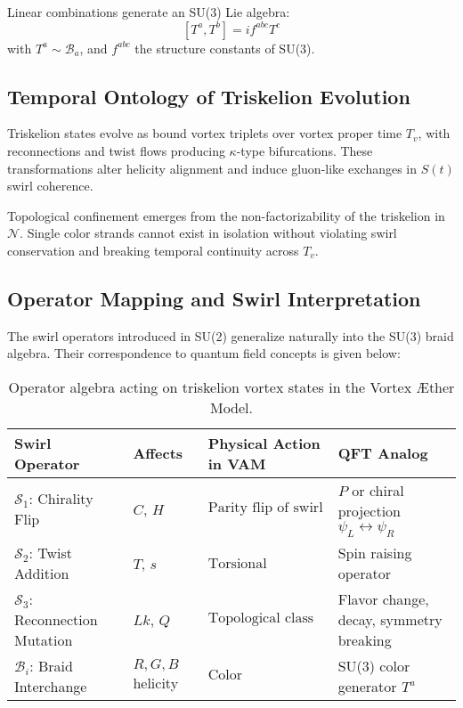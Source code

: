 Linear combinations generate an SU(3) Lie algebra:
\[
[T^a, T^b] = i f^{abc} T^c
\]
with \( T^a \sim \mathcal{B}_a \), and \( f^{abc} \) the structure constants of SU(3).

\subsection*{Temporal Ontology of Triskelion Evolution}

Triskelion states evolve as bound vortex triplets over vortex proper time \( T_v \), with reconnections and twist flows producing \(\kappa\)-type bifurcations. These transformations alter helicity alignment and induce gluon-like exchanges in $S(t)$ swirl coherence.

Topological confinement emerges from the non-factorizability of the triskelion in $\mathcal{N}$. Single color strands cannot exist in isolation without violating swirl conservation and breaking temporal continuity across \( T_v \).

\subsection*{Operator Mapping and Swirl Interpretation}

The swirl operators introduced in SU(2) generalize naturally into the SU(3) braid algebra. Their correspondence to quantum field concepts is given below:

\begin{table}[H]
    \centering
    \scriptsize
    \renewcommand{\arraystretch}{1.4}
    \begin{tabular}{|l|l|l|l|}
        \hline
        \textbf{Swirl Operator} & \textbf{Affects} & \textbf{Physical Action in VAM} & \textbf{QFT Analog} \\
        \hline
        $\mathcal{S}_1$: Chirality Flip & $C$, $H$ & $\text{Parity flip of swirl orientation}$ & $P$ or chiral projection $\psi_L \leftrightarrow \psi_R$ \\
        \hline
        $\mathcal{S}_2$: Twist Addition & $T$, $s$ & $\text{Torsional increment of knot frame}$ & Spin raising operator \\
        \hline
        $\mathcal{S}_3$: Reconnection Mutation & $Lk$, $Q$ & $\text{Topological class bifurcation}$ & Flavor change, decay, symmetry breaking \\
        \hline
        $\mathcal{B}_i$: Braid Interchange & $R,G,B$ helicity & $\text{Color reconnection / gluon-like twist}$ & SU(3) color generator $T^a$ \\
        \hline
    \end{tabular}
    \caption{Operator algebra acting on triskelion vortex states in the Vortex \AE{}ther Model.}
\end{table}

